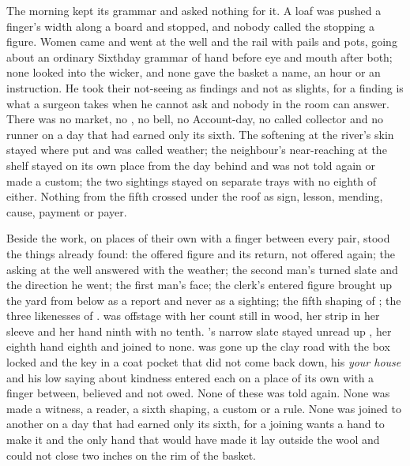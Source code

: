 \scenebreak

The morning kept its grammar and asked nothing for it. A loaf was pushed a finger's width along a board and stopped, and nobody called the stopping a figure. Women came and went at the well and the rail with pails and pots, going about an ordinary Sixthday grammar of hand before eye and mouth after both; none looked into the wicker, and none gave the basket a name, an hour or an instruction. He took their not-seeing as findings and not as slights, for a finding is what a surgeon takes when he cannot ask and nobody in the room can answer. There was no market, no , no bell, no Account-day, no called collector and no runner on a day that had earned only its sixth. The softening at the river's skin stayed where put and was called weather; the neighbour's near-reaching at the shelf stayed on its own place from the day behind and was not told again or made a custom; the two sightings stayed on separate trays with no eighth of either. Nothing from the fifth crossed under the roof as sign, lesson, mending, cause, payment or payer.

Beside the work, on places of their own with a finger between every pair, stood the things already found: the offered figure and its return, not offered again; the asking at the well answered with the weather; the second man's turned slate and the direction he went; the first man's face; the clerk's entered figure brought up the yard from  below  as a report and never as a sighting; the fifth shaping of ; the three likenesses of .  was offstage with her count still in wood, her strip in her sleeve and her hand ninth with no tenth. 's narrow slate stayed unread up , her eighth hand eighth and joined to none.  was gone up the clay road with the box locked and the key in a coat pocket that did not come back down, his \emph{your house} and his low saying about kindness entered each on a place of its own with a finger between, believed and not owed. None of these was told again. None was made a witness, a reader, a sixth shaping, a custom or a rule. None was joined to another on a day that had earned only its sixth, for a joining wants a hand to make it and the only hand that would have made it lay outside the wool and could not close two inches on the rim of the basket.

